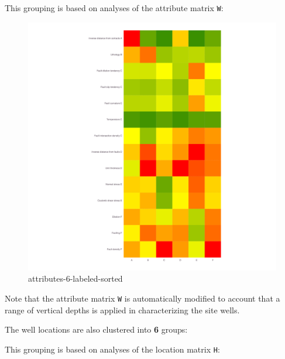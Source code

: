\documentclass[11pt]{article}
\begin{document}
    This grouping is based on analyses of the attribute matrix \texttt{W}:

\begin{figure}
\centering
\includegraphics{../figures-set00-v9-inv-750-1000-daln/attributes-6-labeled-sorted.png}
\caption{attributes-6-labeled-sorted}
\end{figure}

Note that the attribute matrix \texttt{W} is automatically modified to
account that a range of vertical depths is applied in characterizing the
site wells.

The well locations are also clustered into \textbf{6} groups:

This grouping is based on analyses of the location matrix \texttt{H}:
\end{document}
